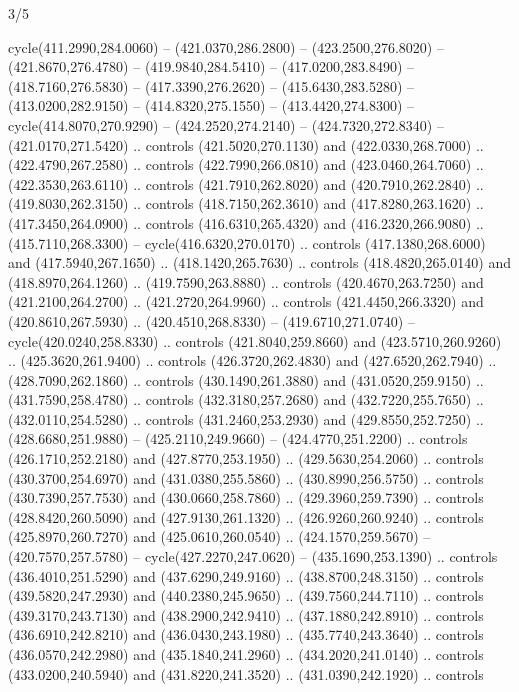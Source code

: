 \begin{flagdescription}{3/5}
\begin{scope}[xshift=0.5\flaglength,yshift=0.5\flagwidth,scale=\flagwidth/768]
\begin{scope}[y=0.80pt, x=0.80pt, yscale=-1.75, xscale=1.75,xshift=-74mm,yshift=-108mm]
\begin{scope}[shift={(-236.93803,83.83961)},fill=cc8a400]
  cycle(411.2990,284.0060) -- (421.0370,286.2800) -- (423.2500,276.8020) --
  (421.8670,276.4780) -- (419.9840,284.5410) -- (417.0200,283.8490) --
  (418.7160,276.5830) -- (417.3390,276.2620) -- (415.6430,283.5280) --
  (413.0200,282.9150) -- (414.8320,275.1550) -- (413.4420,274.8300) --
  cycle(414.8070,270.9290) -- (424.2520,274.2140) -- (424.7320,272.8340) --
  (421.0170,271.5420) .. controls (421.5020,270.1130) and (422.0330,268.7000) ..
  (422.4790,267.2580) .. controls (422.7990,266.0810) and (423.0460,264.7060) ..
  (422.3530,263.6110) .. controls (421.7910,262.8020) and (420.7910,262.2840) ..
  (419.8030,262.3150) .. controls (418.7150,262.3610) and (417.8280,263.1620) ..
  (417.3450,264.0900) .. controls (416.6310,265.4320) and (416.2320,266.9080) ..
  (415.7110,268.3300) -- cycle(416.6320,270.0170) .. controls
  (417.1380,268.6000) and (417.5940,267.1650) .. (418.1420,265.7630) .. controls
  (418.4820,265.0140) and (418.8970,264.1260) .. (419.7590,263.8880) .. controls
  (420.4670,263.7250) and (421.2100,264.2700) .. (421.2720,264.9960) .. controls
  (421.4450,266.3320) and (420.8610,267.5930) .. (420.4510,268.8330) --
  (419.6710,271.0740) -- cycle(420.0240,258.8330) .. controls
  (421.8040,259.8660) and (423.5710,260.9260) .. (425.3620,261.9400) .. controls
  (426.3720,262.4830) and (427.6520,262.7940) .. (428.7090,262.1860) .. controls
  (430.1490,261.3880) and (431.0520,259.9150) .. (431.7590,258.4780) .. controls
  (432.3180,257.2680) and (432.7220,255.7650) .. (432.0110,254.5280) .. controls
  (431.2460,253.2930) and (429.8550,252.7250) .. (428.6680,251.9880) --
  (425.2110,249.9660) -- (424.4770,251.2200) .. controls (426.1710,252.2180) and
  (427.8770,253.1950) .. (429.5630,254.2060) .. controls (430.3700,254.6970) and
  (431.0380,255.5860) .. (430.8990,256.5750) .. controls (430.7390,257.7530) and
  (430.0660,258.7860) .. (429.3960,259.7390) .. controls (428.8420,260.5090) and
  (427.9130,261.1320) .. (426.9260,260.9240) .. controls (425.8970,260.7270) and
  (425.0610,260.0540) .. (424.1570,259.5670) -- (420.7570,257.5780) --
  cycle(427.2270,247.0620) -- (435.1690,253.1390) .. controls
  (436.4010,251.5290) and (437.6290,249.9160) .. (438.8700,248.3150) .. controls
  (439.5820,247.2930) and (440.2380,245.9650) .. (439.7560,244.7110) .. controls
  (439.3170,243.7130) and (438.2900,242.9410) .. (437.1880,242.8910) .. controls
  (436.6910,242.8210) and (436.0430,243.1980) .. (435.7740,243.3640) .. controls
  (436.0570,242.2980) and (435.1840,241.2960) .. (434.2020,241.0140) .. controls
  (433.0200,240.5940) and (431.8220,241.3520) .. (431.0390,242.1920) .. controls

\end{scope}
\end{scope}
\end{scope}
\end{flagdescription}
